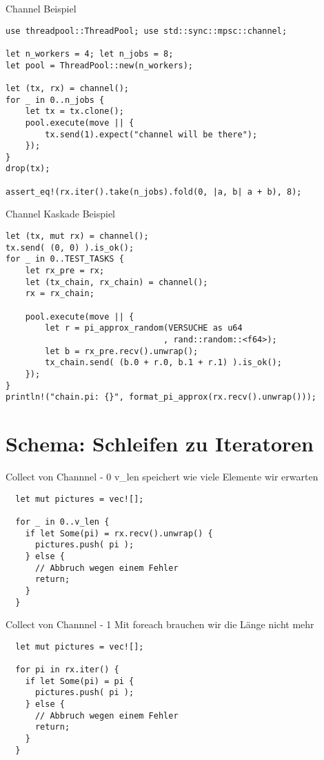 \documentclass[aspectratio=1610,t]{beamer}
\begin{document}
\begin{frame}[fragile]{Channel Beispiel}
\begin{verbatim}
use threadpool::ThreadPool; use std::sync::mpsc::channel;

let n_workers = 4; let n_jobs = 8;
let pool = ThreadPool::new(n_workers);

let (tx, rx) = channel();
for _ in 0..n_jobs {
    let tx = tx.clone();
    pool.execute(move || {
        tx.send(1).expect("channel will be there");
    });
}
drop(tx);

assert_eq!(rx.iter().take(n_jobs).fold(0, |a, b| a + b), 8);
\end{verbatim}
\end{frame}

\begin{frame}[fragile]{Channel Kaskade Beispiel}
\begin{verbatim}
let (tx, mut rx) = channel();
tx.send( (0, 0) ).is_ok();
for _ in 0..TEST_TASKS {
    let rx_pre = rx;
    let (tx_chain, rx_chain) = channel();
    rx = rx_chain;

    pool.execute(move || {
        let r = pi_approx_random(VERSUCHE as u64
                                , rand::random::<f64>);
        let b = rx_pre.recv().unwrap();
        tx_chain.send( (b.0 + r.0, b.1 + r.1) ).is_ok();
    });
}
println!("chain.pi: {}", format_pi_approx(rx.recv().unwrap()));
\end{verbatim}
\end{frame}



{
\section{Schema: Schleifen zu Iteratoren}
}
\begin{frame}[fragile]{Collect von Channnel - 0}
v\_len speichert wie viele Elemente wir erwarten
\begin{verbatim}
  let mut pictures = vec![];

  for _ in 0..v_len {
    if let Some(pi) = rx.recv().unwrap() {
      pictures.push( pi );
    } else {
      // Abbruch wegen einem Fehler
      return;
    }
  }
\end{verbatim}
\end{frame}

\begin{frame}[fragile]{Collect von Channnel - 1}
Mit foreach brauchen wir die Länge nicht mehr
\begin{verbatim}
  let mut pictures = vec![];

  for pi in rx.iter() {
    if let Some(pi) = pi {
      pictures.push( pi );
    } else {
      // Abbruch wegen einem Fehler
      return;
    }
  }
\end{verbatim}
\end{frame}
\end{document}
